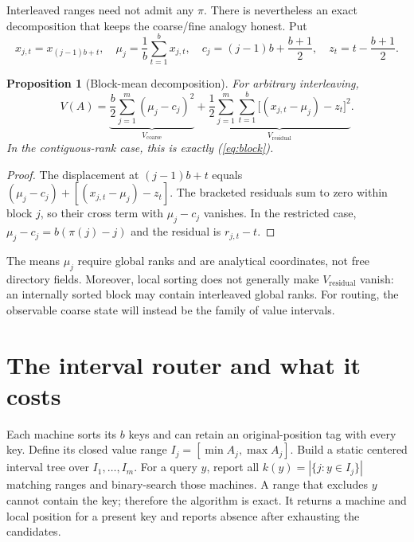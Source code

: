 \documentclass[10pt,letterpaper]{article}
\newtheorem{proposition}[theorem]{Proposition}
\begin{document}
Interleaved ranges need not admit any $\pi$. There is nevertheless an exact decomposition that keeps the coarse/fine analogy honest. Put
\[
 x_{j,t}=x_{(j-1)b+t},\quad
 \mu_j=\frac1b\sum_{t=1}^{b}x_{j,t},\quad
 c_j=(j-1)b+\frac{b+1}{2},\quad
 z_t=t-\frac{b+1}{2}.
\]
\begin{proposition}[Block-mean decomposition]\label{prop:anova}
 For arbitrary interleaving,
 \begin{equation}\label{eq:anova}
 V(A)=\underbrace{\frac b2\sum_{j=1}^{m}(\mu_j-c_j)^2}_{V_{\mathrm{coarse}}}
 +\underbrace{\frac12\sum_{j=1}^{m}\sum_{t=1}^{b}
 \bigl[(x_{j,t}-\mu_j)-z_t\bigr]^2}_{V_{\mathrm{residual}}}.
 \end{equation}
 In the contiguous-rank case, this is exactly (\ref{eq:block}).
\end{proposition}
\begin{proof}
The displacement at $(j-1)b+t$ equals $(\mu_j-c_j)+[(x_{j,t}-\mu_j)-z_t]$. The bracketed residuals sum to zero within block $j$, so their cross term with $\mu_j-c_j$ vanishes. In the restricted case, $\mu_j-c_j=b(\pi(j)-j)$ and the residual is $r_{j,t}-t$.
\end{proof}
The means $\mu_j$ require global ranks and are analytical coordinates, not free directory fields. Moreover, local sorting does not generally make $V_{\mathrm{residual}}$ vanish: an internally sorted block may contain interleaved global ranks. For routing, the observable coarse state will instead be the family of value intervals.

\section{The interval router and what it costs}
Each machine sorts its $b$ keys and can retain an original-position tag with every key. Define its closed value range $I_j=[\min A_j,\max A_j]$. Build a static centered interval tree over $I_1,\ldots,I_m$. For a query $y$, report all $k(y)=|\{j:y\in I_j\}|$ matching ranges and binary-search those machines. A range that excludes $y$ cannot contain the key; therefore the algorithm is exact. It returns a machine and local position for a present key and reports absence after exhausting the candidates.
\end{document}
